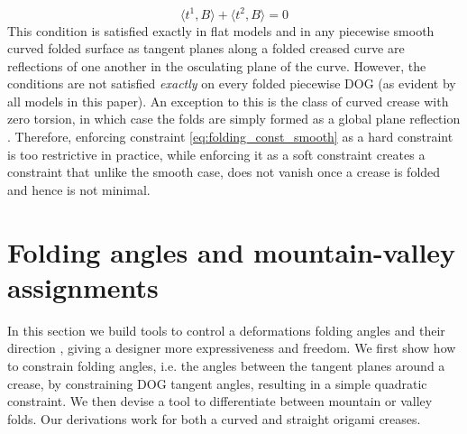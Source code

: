 \begin{equation} \label{eq:folding_const_smooth} 
\langle t^1,B\rangle + \langle t^2,B\rangle = 0
\end{equation}
This condition is satisfied exactly in flat models and in any piecewise smooth curved folded surface as tangent planes along a folded creased curve are reflections of one another in the osculating plane of the curve. However, the conditions are not satisfied \emph{exactly} on every folded piecewise DOG (as evident by all models in this paper). An exception to this is the class of curved crease with zero torsion, in which case the folds are simply formed as a global plane reflection \cite{Mitani_ref}. Therefore, enforcing constraint \eqref{eq:folding_const_smooth} as a hard constraint is too restrictive in practice, while enforcing it as a soft constraint creates a constraint that unlike the smooth case, does not vanish once a crease is folded and hence is not minimal.

\section{Folding angles and mountain-valley assignments} \label{sec:folding_angles_mountain_valley}
In this section we build tools to control a deformations folding angles and their direction , giving a designer more expressiveness and freedom. We first show how to constrain folding angles, i.e. the angles between the tangent planes around a crease, by constraining DOG tangent angles, resulting in a simple quadratic constraint. We then devise a tool to differentiate between mountain or valley folds. Our derivations work for both a curved and straight origami creases.


